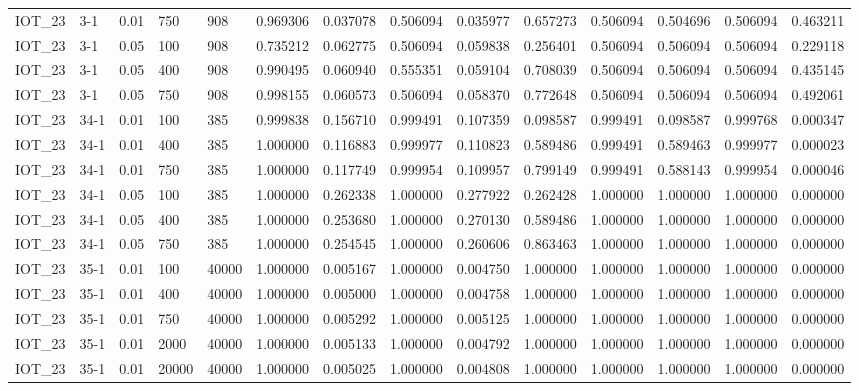 \begin{tabular}{llllllllllllll}
IOT\_23 & 3-1 & 0.01 & 750 & 908 & 0.969306 & 0.037078 & 0.506094 & 0.035977 & 0.657273 & 0.506094 & 0.504696 & 0.506094 & 0.463211 \\
IOT\_23 & 3-1 & 0.05 & 100 & 908 & 0.735212 & 0.062775 & 0.506094 & 0.059838 & 0.256401 & 0.506094 & 0.506094 & 0.506094 & 0.229118 \\
IOT\_23 & 3-1 & 0.05 & 400 & 908 & 0.990495 & 0.060940 & 0.555351 & 0.059104 & 0.708039 & 0.506094 & 0.506094 & 0.506094 & 0.435145 \\
IOT\_23 & 3-1 & 0.05 & 750 & 908 & 0.998155 & 0.060573 & 0.506094 & 0.058370 & 0.772648 & 0.506094 & 0.506094 & 0.506094 & 0.492061 \\
IOT\_23 & 34-1 & 0.01 & 100 & 385 & 0.999838 & 0.156710 & 0.999491 & 0.107359 & 0.098587 & 0.999491 & 0.098587 & 0.999768 & 0.000347 \\
IOT\_23 & 34-1 & 0.01 & 400 & 385 & 1.000000 & 0.116883 & 0.999977 & 0.110823 & 0.589486 & 0.999491 & 0.589463 & 0.999977 & 0.000023 \\
IOT\_23 & 34-1 & 0.01 & 750 & 385 & 1.000000 & 0.117749 & 0.999954 & 0.109957 & 0.799149 & 0.999491 & 0.588143 & 0.999954 & 0.000046 \\
IOT\_23 & 34-1 & 0.05 & 100 & 385 & 1.000000 & 0.262338 & 1.000000 & 0.277922 & 0.262428 & 1.000000 & 1.000000 & 1.000000 & 0.000000 \\
IOT\_23 & 34-1 & 0.05 & 400 & 385 & 1.000000 & 0.253680 & 1.000000 & 0.270130 & 0.589486 & 1.000000 & 1.000000 & 1.000000 & 0.000000 \\
IOT\_23 & 34-1 & 0.05 & 750 & 385 & 1.000000 & 0.254545 & 1.000000 & 0.260606 & 0.863463 & 1.000000 & 1.000000 & 1.000000 & 0.000000 \\
IOT\_23 & 35-1 & 0.01 & 100 & 40000 & 1.000000 & 0.005167 & 1.000000 & 0.004750 & 1.000000 & 1.000000 & 1.000000 & 1.000000 & 0.000000 \\
IOT\_23 & 35-1 & 0.01 & 400 & 40000 & 1.000000 & 0.005000 & 1.000000 & 0.004758 & 1.000000 & 1.000000 & 1.000000 & 1.000000 & 0.000000 \\
IOT\_23 & 35-1 & 0.01 & 750 & 40000 & 1.000000 & 0.005292 & 1.000000 & 0.005125 & 1.000000 & 1.000000 & 1.000000 & 1.000000 & 0.000000 \\
IOT\_23 & 35-1 & 0.01 & 2000 & 40000 & 1.000000 & 0.005133 & 1.000000 & 0.004792 & 1.000000 & 1.000000 & 1.000000 & 1.000000 & 0.000000 \\
IOT\_23 & 35-1 & 0.01 & 20000 & 40000 & 1.000000 & 0.005025 & 1.000000 & 0.004808 & 1.000000 & 1.000000 & 1.000000 & 1.000000 & 0.000000 \\

\end{tabular}
